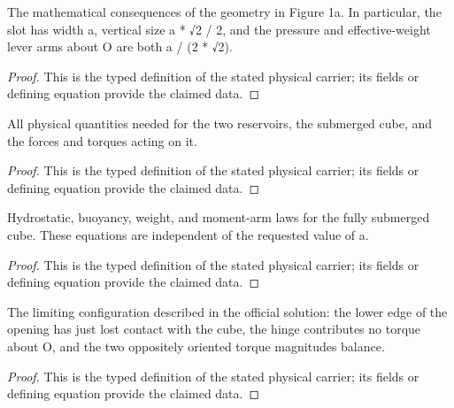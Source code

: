 \begin{definition}
  \label{def:physics:IPhO_2026_1_A_1:aux013}
  The mathematical consequences of the geometry in Figure 1a. In particular, the slot has width a, vertical size a * √2 / 2, and the pressure and effective-weight lever arms about O are both a / (2 * √2).
\end{definition}
\begin{proof}
  This is the typed definition of the stated physical carrier; its fields or defining equation provide the claimed data.
\end{proof}

\begin{definition}
  \label{def:physics:IPhO_2026_1_A_1:aux014}
  All physical quantities needed for the two reservoirs, the submerged cube, and the forces and torques acting on it.
\end{definition}
\begin{proof}
  This is the typed definition of the stated physical carrier; its fields or defining equation provide the claimed data.
\end{proof}

\begin{definition}
  \label{def:physics:IPhO_2026_1_A_1:aux015}
  Hydrostatic, buoyancy, weight, and moment-arm laws for the fully submerged cube. These equations are independent of the requested value of a.
\end{definition}
\begin{proof}
  This is the typed definition of the stated physical carrier; its fields or defining equation provide the claimed data.
\end{proof}

\begin{definition}
  \label{def:physics:IPhO_2026_1_A_1:aux016}
  The limiting configuration described in the official solution: the lower edge of the opening has just lost contact with the cube, the hinge contributes no torque about O, and the two oppositely oriented torque magnitudes balance.
\end{definition}
\begin{proof}
  This is the typed definition of the stated physical carrier; its fields or defining equation provide the claimed data.
\end{proof}

